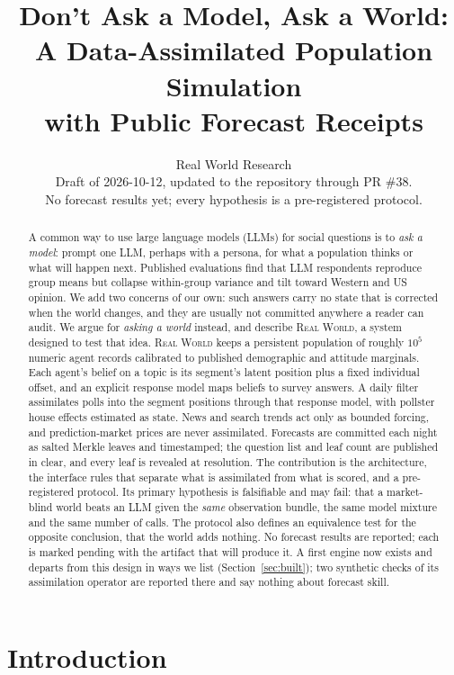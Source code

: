 \documentclass[11pt]{article}
\title{Don't Ask a Model, Ask a World:\\ A Data-Assimilated Population Simulation\\ with Public Forecast Receipts}
\author{Real World Research\\ \small Draft of 2026-10-12, updated to the repository through PR \#38.\\ \small No forecast results yet; every hypothesis is a pre-registered protocol.}
\date{}
\newcommand{\RW}{\textsc{Real World}}
\begin{document}
\maketitle

\begin{abstract}
A common way to use large language models (LLMs) for social questions is to \emph{ask a model}: prompt one LLM, perhaps with a persona, for what a population thinks or what will happen next. Published evaluations find that LLM respondents reproduce group means but collapse within-group variance and tilt toward Western and US opinion. We add two concerns of our own: such answers carry no state that is corrected when the world changes, and they are usually not committed anywhere a reader can audit. We argue for \emph{asking a world} instead, and describe \RW{}, a system designed to test that idea. \RW{} keeps a persistent population of roughly $10^5$ numeric agent records calibrated to published demographic and attitude marginals. Each agent's belief on a topic is its segment's latent position plus a fixed individual offset, and an explicit response model maps beliefs to survey answers. A daily filter assimilates polls into the segment positions through that response model, with pollster house effects estimated as state. News and search trends act only as bounded forcing, and prediction-market prices are never assimilated. Forecasts are committed each night as salted Merkle leaves and timestamped; the question list and leaf count are published in clear, and every leaf is revealed at resolution. The contribution is the architecture, the interface rules that separate what is assimilated from what is scored, and a pre-registered protocol. Its primary hypothesis is falsifiable and may fail: that a market-blind world beats an LLM given the \emph{same} observation bundle, the same model mixture and the same number of calls. The protocol also defines an equivalence test for the opposite conclusion, that the world adds nothing. No forecast results are reported; each is marked pending with the artifact that will produce it. A first engine now exists and departs from this design in ways we list (Section~\ref{sec:built}); two synthetic checks of its assimilation operator are reported there and say nothing about forecast skill.
\end{abstract}

\section{Introduction}
\end{document}
